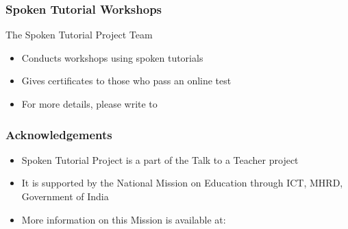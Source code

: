 \documentclass[17pt]{beamer}
\begin{document}
\begin{frame}
\frametitle{Spoken Tutorial Workshops}The Spoken Tutorial Project Team 
\begin{itemize}
\item Conducts workshops using spoken tutorials 
\item Gives certificates to those who pass an online test 
\item For more details, please write to \\ 
\end{itemize}
\end{frame}

\begin{frame}
\frametitle{Acknowledgements}
\begin{itemize}
\item Spoken Tutorial Project is a part of the Talk to a Teacher  project 
\item It is supported by the National Mission on Education through  ICT, MHRD, Government of India 
\item More information on this Mission is available at: \\ 
\end{itemize}
\end{frame}
\end{document}
